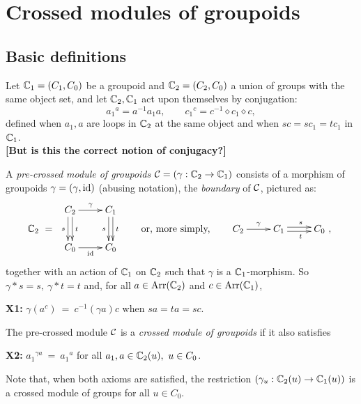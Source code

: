 

\newpage
\section{Crossed modules of groupoids} \label{sec:xmod-gpd}


\subsection{Basic definitions}  \label{sec:xmod-gpd-defs}

Let $\mathbb{C}_1=(C_1,C_0)$ be a groupoid and $\mathbb{C}_2=(C_2,C_0)$ 
a union of groups with the same object set, 
and let $\mathbb{C}_2,\mathbb{C}_1$ act upon themselves by conjugation:
$$
{a_1}^a = a^{-1}a_1a, 
\qquad {c_1}^c = c^{-1} \diamond c_1 \diamond c, 
$$
defined when $a_1,a$ are loops in $\mathbb{C}_2$ at the same object 
and when $sc = sc_1 = tc_1$ in $\mathbb{C}_1$. \\
{\bf [But is this the correct notion of conjugacy?]}

\medskip
A \emph{pre-crossed module of groupoids}  
$\mathcal{C} = (\gamma : \mathbb{C}_2 \to \mathbb{C}_1)$ 
consists of a morphism of groupoids $\gamma = (\gamma,\mathrm{id})$ 
(abusing notation), 
the \emph{boundary} of $\mathcal{C}$,  
pictured as: 
$$
\bbC_2 ~=~ 
\vcenter{
\xymatrix{ 
  C_2  \ar[r]^{\gamma}  \ar[d]<+0.5ex>^t \ar[d]<-0.5ex>_s 
     &  C_1 \ar[d]<+0.5ex>^t \ar[d]<-0.5ex>_s \\ 
  C_0  \ar[r]_{\id}
     &  C_0  \\
}}
\qquad\text{or, more simply,}\qquad
\xymatrix{ 
  C_2  \ar[r]^{\gamma}  
     &  C_1 \ar[r]<+0.5ex>^s \ar[r]<-0.5ex>_t 
        &  C_0 ~, \\
}
$$
together with an action %
of $\mathbb{C}_1$ on $\mathbb{C}_2$ 
such that $\gamma$  is a $\mathbb{C}_1$-morphism.
So $\gamma*s=s,~ \gamma*t=t$ and, 
for all $a \in \mathrm{Arr}(\mathbb{C}_2)$  and  $c \in \mathrm{Arr}(\mathbb{C}_1)$,
\begin{center}
\textbf{X1:} \qquad
  $\gamma(a^c) ~=~ c^{-1} (\gamma a) c$ 
  \quad when \quad $sa = ta = sc$.\qquad
\end{center}

\noindent
The pre-crossed module  $\mathcal{C}$  is a \emph{crossed module of groupoids}
if it also satisfies 
\begin{center}
\textbf{X2:} \qquad
  ${a_1}^{\gamma a} ~=~ {a_1}^a$ 
  \quad for all \quad  
  $a_1,a \in \mathbb{C}_2(u),~ u \in C_0$.  
\end{center}
Note that, when both axioms are satisfied, 
the restriction $(\gamma_u : \mathbb{C}_2(u) \to \mathbb{C}_1(u))$ 
is a crossed module of groups for all $u \in C_0$. 

